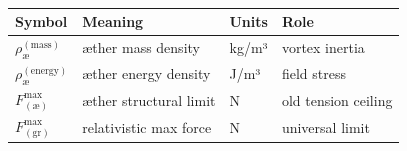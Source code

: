 \documentclass[11pt]{article}
\begin{document}
\begin{table}
    \centering
    \begin{tabular}{llll}
        \toprule
        \textbf{Symbol} & \textbf{Meaning} & \textbf{Units} & \textbf{Role} \\
        \midrule
        $\rho_{\text{æ}}^{(\mathrm{mass})}$ & æther mass density & kg/m³ & vortex inertia \\
        $\rho_{\text{æ}}^{(\mathrm{energy})}$& æther energy density & J/m³ & field stress \\
        $F^{\max}_{(\text{æ})}$             & æther structural limit & N & old tension ceiling \\
        $F^{\max}_{(\mathrm{gr})}$         & relativistic max force & N & universal limit \\
        \bottomrule
    \end{tabular}
    \caption{}
    \label{tab:}
\end{table}


    \medskip
\end{document}
